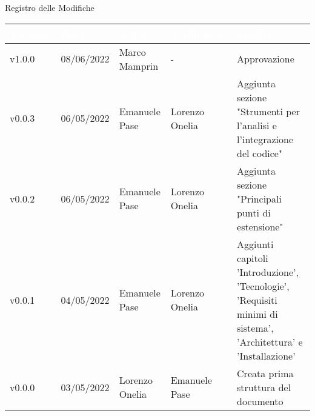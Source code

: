 \begin{center}
  \huge{Registro delle Modifiche}
\end{center}
\renewcommand\arraystretch{1,5}
{\centering
\begin{longtable}{|C{1.8cm}|C{2.1cm}|C{2cm}|C{2.4cm}|L{4.4cm}|}
  \hline
  \textcolor[HTML]{FFFFFF}{\textbf{Versione}} & \textcolor[HTML]{FFFFFF}{\textbf{Data}} & \textcolor[HTML]{FFFFFF}{\textbf{Autore}}  & \textcolor[HTML]{FFFFFF}{\textbf{Verificatore}} & \textcolor[HTML]{FFFFFF}{\textbf{Modifica}}    \\ \hline
  v1.0.0        & 08/06/2022    & Marco Mamprin    & -    & Approvazione  \\ \hline
  v0.0.3        & 06/05/2022    & Emanuele Pase   &  Lorenzo Onelia  & Aggiunta sezione "Strumenti per l’analisi e l’integrazione del codice" \\ \hline
  v0.0.2        & 06/05/2022    & Emanuele Pase   &  Lorenzo Onelia  & Aggiunta sezione "Principali punti di estensione" \\ \hline
  v0.0.1       & 04/05/2022    & Emanuele Pase   &   Lorenzo Onelia   & Aggiunti capitoli 'Introduzione', 'Tecnologie', 'Requisiti minimi di sistema', 'Architettura' e 'Installazione'\\ \hline
  v0.0.0        & 03/05/2022    & Lorenzo Onelia   & Emanuele Pase   & Creata prima struttura del documento \\ \hline
\end{longtable}}

\renewcommand\arraystretch{1}
